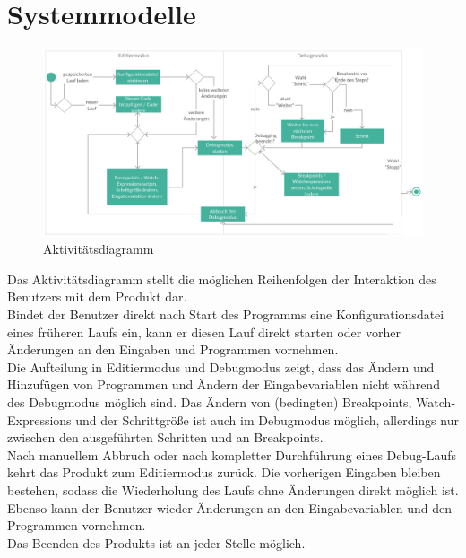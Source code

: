 \documentclass[parskip=full]{scrartcl}
\begin{document}
\section{Systemmodelle}
\begin{figure}[h] 
  \centering
     \includegraphics[width=1.0\textwidth]{Aktivitaetsdiagramm}
  \caption{Aktivitätsdiagramm}
  \label{fig:Bild2}
\end{figure}
\vspace{0.7cm}
Das Aktivitätsdiagramm stellt die möglichen Reihenfolgen der Interaktion des Benutzers mit dem Produkt dar. \\
Bindet der Benutzer direkt nach Start des Programms eine \gls{Konfigurationsdatei} eines früheren Laufs ein, kann er diesen Lauf direkt starten oder vorher Änderungen an den Eingaben und Programmen vornehmen. \\
Die Aufteilung in \gls{Editiermodus} und \gls{Debugmodus} zeigt, dass das Ändern und Hinzufügen von Programmen und Ändern der Eingabevariablen nicht während des Debugmodus möglich sind. Das Ändern von (bedingten) \glspl{Breakpoint}, \glspl{Watch-Expression} und der Schrittgröße ist auch im Debugmodus möglich, allerdings nur zwischen den ausgeführten Schritten und an Breakpoints. \\
Nach manuellem Abbruch oder nach kompletter Durchführung eines Debug-Laufs kehrt das Produkt zum Editiermodus zurück. Die vorherigen Eingaben bleiben bestehen, sodass die Wiederholung des Laufs ohne Änderungen direkt möglich ist. Ebenso kann der Benutzer wieder Änderungen an den Eingabevariablen und den Programmen vornehmen.\\
Das Beenden des Produkts ist an jeder Stelle möglich.

\newpage
\end{document}
